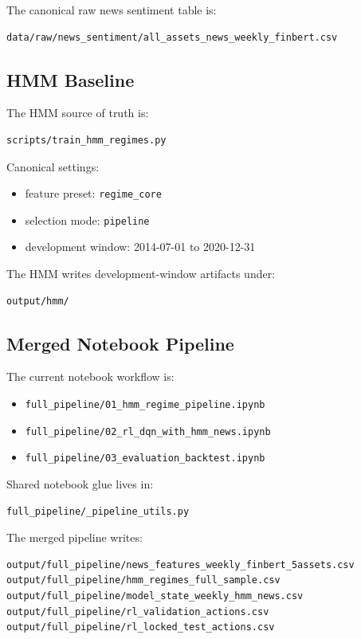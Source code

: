 \documentclass[11pt,a4paper]{article}
\begin{document}
The canonical raw news sentiment table is:
\begin{verbatim}
data/raw/news_sentiment/all_assets_news_weekly_finbert.csv
\end{verbatim}

\subsection{HMM Baseline}

The HMM source of truth is:
\begin{verbatim}
scripts/train_hmm_regimes.py
\end{verbatim}

Canonical settings:
\begin{itemize}[nosep]
    \item feature preset: \texttt{regime\_core}
    \item selection mode: \texttt{pipeline}
    \item development window: 2014-07-01 to 2020-12-31
\end{itemize}

The HMM writes development-window artifacts under:
\begin{verbatim}
output/hmm/
\end{verbatim}

\subsection{Merged Notebook Pipeline}

The current notebook workflow is:
\begin{itemize}[nosep]
    \item \texttt{full\_pipeline/01\_hmm\_regime\_pipeline.ipynb}
    \item \texttt{full\_pipeline/02\_rl\_dqn\_with\_hmm\_news.ipynb}
    \item \texttt{full\_pipeline/03\_evaluation\_backtest.ipynb}
\end{itemize}

Shared notebook glue lives in:
\begin{verbatim}
full_pipeline/_pipeline_utils.py
\end{verbatim}

The merged pipeline writes:
\begin{verbatim}
output/full_pipeline/news_features_weekly_finbert_5assets.csv
output/full_pipeline/hmm_regimes_full_sample.csv
output/full_pipeline/model_state_weekly_hmm_news.csv
output/full_pipeline/rl_validation_actions.csv
output/full_pipeline/rl_locked_test_actions.csv
\end{verbatim}
\end{document}
